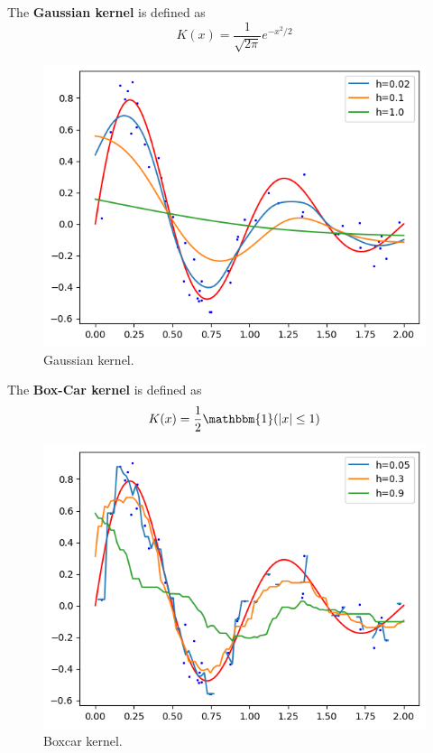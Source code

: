 \documentclass{article}
\begin{document}
    \begin{definition}
      The \textbf{Gaussian kernel} is defined as 
      \begin{equation}
        K(x) = \frac{1}{\sqrt{2 \pi}} e^{-x^2/2}
      \end{equation}
      \begin{figure}[H]
        \centering 
        \includegraphics[scale=0.6]{img/gaussian_smoother.png}
        \caption{Gaussian kernel. } 
        \label{fig:gaussian_smoother}
      \end{figure}
    \end{definition}

    \begin{definition}
      The \textbf{Box-Car kernel} is defined as 
      \begin{equation}
        K(x) = \frac{1}{2} \mathbbm{1}(|x| \leq 1)
      \end{equation}
      \begin{figure}[H]
        \centering 
        \includegraphics[scale=0.6]{img/boxcar_smoother.png}
        \caption{Boxcar kernel. } 
        \label{fig:boxcar_smoother}
      \end{figure}
    \end{definition}
\end{document}
